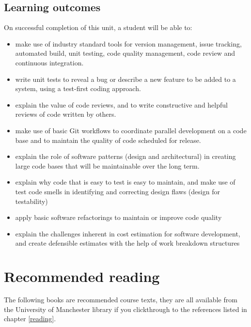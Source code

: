 \documentclass[
]{book}
\providecommand{\tightlist}{%
  \setlength{\itemsep}{0pt}\setlength{\parskip}{0pt}}
\begin{document}
\hypertarget{learning-outcomes}{%
\subsection{Learning outcomes}\label{learning-outcomes}}

On successful completion of this unit, a student will be able to:

\begin{itemize}
\tightlist
\item
  make use of industry standard tools for version management, issue tracking, automated build, unit testing, code quality management, code review and continuous integration.
\item
  write unit tests to reveal a bug or describe a new feature to be added to a system, using a test-first coding approach.
\item
  explain the value of code reviews, and to write constructive and helpful reviews of code written by others.
\item
  make use of basic Git workflows to coordinate parallel development on a code base and to maintain the quality of code scheduled for release.
\item
  explain the role of software patterns (design and architectural) in creating large code bases that will be maintainable over the long term.
\item
  explain why code that is easy to test is easy to maintain, and make use of test code smells in identifying and correcting design flaws (design for testability)
\item
  apply basic software refactorings to maintain or improve code quality
\item
  explain the challenges inherent in cost estimation for software development, and create defensible estimates with the help of work breakdown structures
\end{itemize}

\hypertarget{recread}{%
\section{Recommended reading}\label{recread}}

The following books are recommended course texts, they are all available from the University of Manchester library if you clickthrough to the references listed in chapter \ref{reading}.
\end{document}
